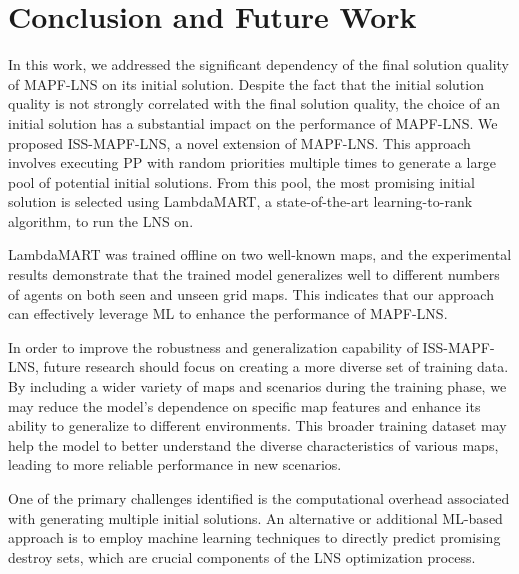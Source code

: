 \documentclass[runningheads]{llncs}
\begin{document}
\section{Conclusion and Future Work} \label{sec:conclusions}

In this work, we addressed the significant dependency of the final solution quality of MAPF-LNS on its initial solution. Despite the fact that the initial solution quality is not strongly correlated with the final solution quality, the choice of an initial solution has a substantial impact on the performance of MAPF-LNS. We proposed ISS-MAPF-LNS, a novel extension of MAPF-LNS. This approach involves executing PP with random priorities multiple times to generate a large pool of potential initial solutions. From this pool, the most promising initial solution is selected using LambdaMART, a state-of-the-art learning-to-rank algorithm, to run the LNS on.

LambdaMART was trained offline on two well-known maps, and the experimental results demonstrate that the trained model generalizes well to different numbers of agents on both seen and unseen grid maps. This indicates that our approach can effectively leverage ML to enhance the performance of MAPF-LNS.

In order to improve the robustness and generalization capability of ISS-MAPF-LNS, future research should focus on creating a more diverse set of training data. By including a wider variety of maps and scenarios during the training phase, we may reduce the model's dependence on specific map features and enhance its ability to generalize to different environments. This broader training dataset may help the model to better understand the diverse characteristics of various maps, leading to more reliable performance in new scenarios.

One of the primary challenges identified is the computational overhead associated with generating multiple initial solutions. An alternative or additional ML-based approach is to employ machine learning techniques to directly predict promising destroy sets, which are crucial components of the LNS optimization process. 

%
%
%


\end{document}
